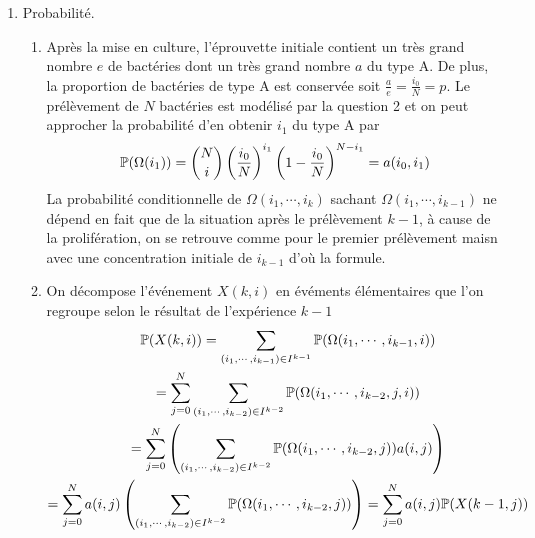 \begin{enumerate}
  \item Probabilité.
\begin{enumerate}
  \item Après la mise en culture, l'éprouvette initiale contient un très grand nombre $e$ de bactéries dont un très grand nombre $a$ du type A. De plus, la proportion de bactéries de type A est conservée soit $\frac{a}{e} = \frac{i_0}{N}=p$. Le prélèvement de $N$ bactéries est modélisé par la question 2 et on peut approcher la probabilité d'en obtenir $i_1$ du type A par 
\begin{displaymath}
  \mathbb{P}(\Omega(i_1)) = \binom{N}{i}\left( \frac{i_0}{N}\right)^{i_1}\left( 1-\frac{i_0}{N}\right)^{N-i_1} = a(i_0,i_1)
\end{displaymath}
La probabilité conditionnelle de $\Omega(i_1,\cdots,i_k)$ sachant $\Omega(i_1,\cdots,i_{k-1})$ ne dépend en fait que de la situation après le prélèvement $k-1$, à cause de la prolifération, on se retrouve comme pour le premier prélèvement maisn avec une concentration initiale de $i_{k-1}$ d'où la formule.
  \item On décompose l'événement $X(k,i)$ en évéments élémentaires que l'on regroupe selon le résultat de l'expérience $k-1$
\begin{multline*}
\mathbb{P}(X(k,i))= \sum_{(i_1,\cdots,i_{k-1})\in I^{k-1}}\mathbb{P}(\Omega(i_1,\cdots,i_{k-1},i)) \\
= \sum_{j=0}^N \sum_{(i_1,\cdots,i_{k-2})\in I^{k-2}}\mathbb{P}(\Omega(i_1,\cdots,i_{k-2},j,i))\\
= \sum_{j=0}^N \left( \sum_{(i_1,\cdots,i_{k-2})\in I^{k-2}}\mathbb{P}(\Omega(i_1,\cdots,i_{k-2},j))a(i,j)\right)\\ 
= \sum_{j=0}^N a(i,j)\left( \sum_{(i_1,\cdots,i_{k-2})\in I^{k-2}}\mathbb{P}(\Omega(i_1,\cdots,i_{k-2},j))\right) 
= \sum_{j=0}^N a(i,j)\mathbb{P}(X(k-1,j))
\end{multline*}


\end{enumerate}
\end{enumerate}
